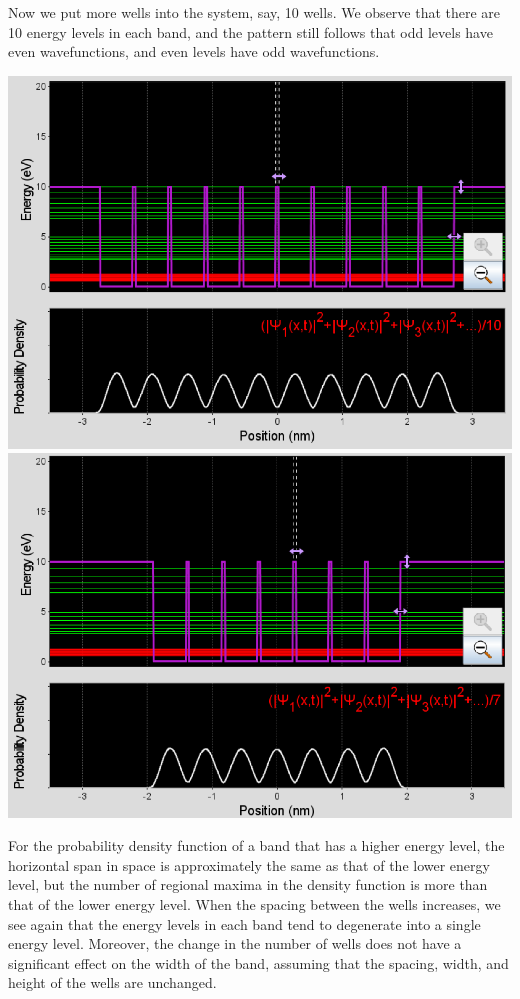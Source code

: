 \documentclass[11pt]{book}
\theoremstyle{break}
\theoremstyle{break}
\begin{document}
Now we put more wells into the system, say, 10 wells. We observe that there are 10 energy levels in each band, and the pattern still follows that odd levels have even wavefunctions, and even levels have odd wavefunctions.
\begin{center}
\includegraphics[scale=0.38]{3a}
\includegraphics[scale=0.38]{3b}
\end{center}
For the probability density function of a band that has a higher energy level, the horizontal span in space is approximately the same as that of the lower energy level, but the number of regional maxima in the density function is more than that of the lower energy level. When the spacing between the wells increases, we see again that the energy levels in each band tend to degenerate into a single energy level. Moreover, the change in the number of wells does not have a significant effect on the width of the band, assuming that the spacing, width, and height of the wells are unchanged. \\
\end{document}
